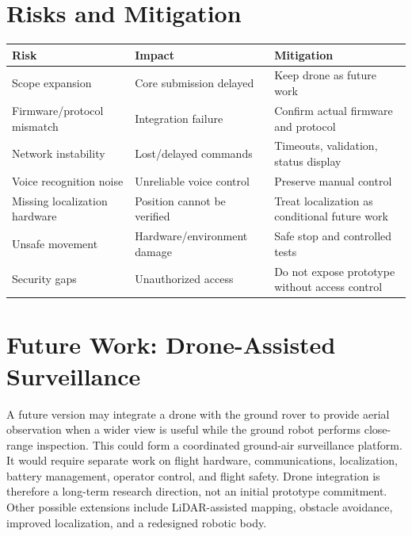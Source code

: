 \documentclass[12pt,a4paper]{article}
\begin{document}
\section{Risks and Mitigation}
\begin{longtable}{p{3cm}p{4cm}p{5cm}}\toprule
Risk & Impact & Mitigation\\\midrule
Scope expansion & Core submission delayed & Keep drone as future work\\
Firmware/protocol mismatch & Integration failure & Confirm actual firmware and protocol\\
Network instability & Lost/delayed commands & Timeouts, validation, status display\\
Voice recognition noise & Unreliable voice control & Preserve manual control\\
Missing localization hardware & Position cannot be verified & Treat localization as conditional future work\\
Unsafe movement & Hardware/environment damage & Safe stop and controlled tests\\
Security gaps & Unauthorized access & Do not expose prototype without access control\\\bottomrule
\end{longtable}

\section{Future Work: Drone-Assisted Surveillance}
A future version may integrate a drone with the ground rover to provide aerial observation when a wider view is useful while the ground robot performs close-range inspection. This could form a coordinated ground-air surveillance platform. It would require separate work on flight hardware, communications, localization, battery management, operator control, and flight safety. Drone integration is therefore a long-term research direction, not an initial prototype commitment. Other possible extensions include LiDAR-assisted mapping, obstacle avoidance, improved localization, and a redesigned robotic body.
\end{document}
